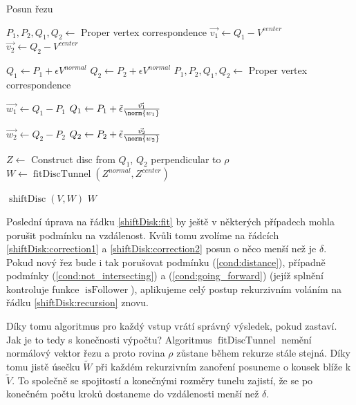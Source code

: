 \begin{algorithm}
\caption{Posun řezu}
\label{alg:shiftDisk}
\begin{algorithmic}[1]

    \State $ P_1, P_2, Q_1, Q_2 \gets $ Proper vertex correspondence
    \State $ \vec{v_1} \gets Q_1 - V^{center} $
    \State $ \vec{v_2} \gets Q_2 - V^{center} $
    \Statex

        \State $ Q_1 \gets P_1 + \epsilon V^{normal} $
        \State $ Q_2 \gets P_2 + \epsilon V^{normal} $
    \EndIf
    \State $ P_1, P_2, Q_1, Q_2 \gets $ Proper vertex correspondence
    \Statex

    \State $ \vec{w_1} \gets Q_1 - P_1 $
        $ Q_1 \gets P_1 + \tilde{\epsilon} \frac{\vec{v_1}}{\norm{w_1}} $ \label{shiftDisk:correction1}
    \EndIf

    \State $ \vec{w_2} \gets Q_2 - P_2 $
        $ Q_2 \gets P_2 + \tilde{\epsilon} \frac{\vec{v_2}}{\norm{w_2}} $ \label{shiftDisk:correction2}
    \EndIf
    \Statex

    \State $ Z \gets $ Construct disc from $ Q_1$, $Q_2$ perpendicular to $ \rho $
    \State $ W \gets \operatorname{fitDiscTunnel}(Z^{normal}, Z^{center}) $ \label{shiftDisk:fit}
    \Statex

        \State \Return $ \operatorname{shiftDisc}(V, W) $ \label{shiftDisk:recursion}
    \Else
        \State \Return $ W $
    \EndIf

\EndFunction

\end{algorithmic}
\end{algorithm}

Poslední úprava na řádku \ref{shiftDisk:fit} by ještě v některých případech mohla
porušit podmínku na vzdálenost. Kvůli tomu zvolíme na řádcích
\ref{shiftDisk:correction1} a \ref{shiftDisk:correction2} posun o něco
menší než je $ \delta $. Pokud nový řez bude i tak porušovat podmínku (\ref{cond:distance}),
případně podmínky (\ref{cond:not_intersecting}) a (\ref{cond:going_forward})
(jejíž splnění kontroluje funkce $ \operatorname{isFollower} $),
aplikujeme celý postup rekurzivním voláním na řádku \ref{shiftDisk:recursion} znovu.

Díky tomu algoritmus pro každý vstup vrátí správný výsledek, pokud zastaví.
Jak je to tedy s konečnosti výpočtu? Algoritmus $\operatorname{fitDiscTunnel} $
nemění normálový vektor řezu a proto
rovina $ \rho $ zůstane během rekurze stále stejná. Díky tomu jistě úsečku
$ \widetilde{W} $ při každém rekurzivním zanoření posuneme o kousek blíže k
$ \widetilde{V} $. To společně se spojitostí a konečnými rozměry tunelu zajistí,
že se po konečném počtu kroků dostaneme do vzdálenosti menší než $ \delta $.

